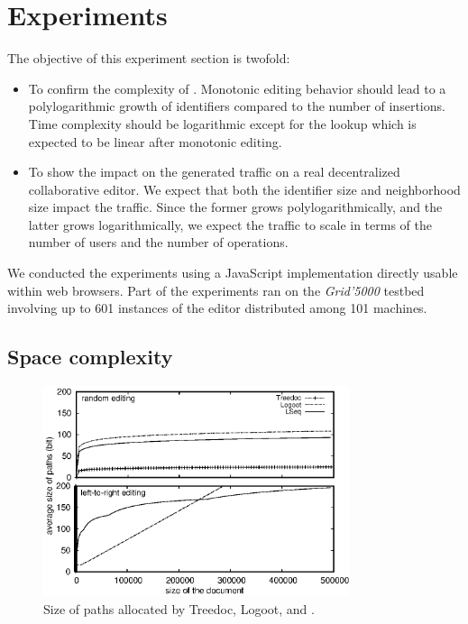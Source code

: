 \section{Experiments}
\label{sec:experiments}

The objective of this experiment section is twofold:
\begin{itemize}[noitemsep, leftmargin=*]
\item To confirm the complexity of \LSEQ. Monotonic editing behavior should lead
  to a polylogarithmic growth of identifiers compared to the number of
  insertions. Time complexity should be logarithmic except for the lookup which
  is expected to be linear after monotonic editing.
\item To show the impact on the generated traffic on a real decentralized
  collaborative editor. We expect that both the identifier size and neighborhood
  size impact the traffic. Since the former grows polylogarithmically, and the
  latter grows logarithmically, we expect the traffic to scale in terms of
  the number of users and the number of operations.
\end{itemize}

We conducted the experiments using a JavaScript implementation directly usable
within web browsers. Part of the experiments ran on the \emph{Grid'5000} testbed
involving up to 601 instances of the editor distributed among 101 machines.


\subsection{Space complexity}

\begin{figure}
  \centering
  \includegraphics[width=0.8\textwidth]{./img/space.eps}
  \caption{\label{fig:space}Size of paths allocated by Treedoc, Logoot, and
    \LSEQ.}
\end{figure}



